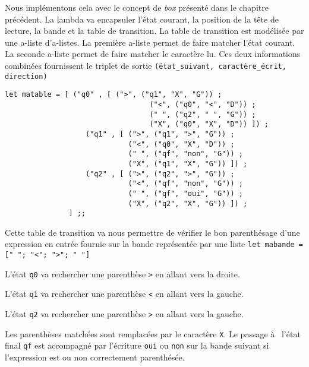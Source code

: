 Nous implémentons cela avec le concept de \textit{box} présenté dans le chapitre
précédent. La lambda va encapsuler l'état courant, la position de la tête de
lecture, la bande et la table de transition.
La table de transition est modélisée par une a-liste d'a-listes.
La première a-liste permet de faire matcher l'état courant.
La seconde a-liste permet de faire matcher le caractère lu.
Ces deux informations combinées fournissent  le triplet de sortie
\verb+(état_suivant, caractère_écrit, direction)+

\begin{Verbatim}
let matable = [ ("q0" , [ (">", ("q1", "X", "G")) ;
								  ("<", ("q0", "<", "D")) ; 
								  (" ", ("q2", " ", "G")) ;
								  ("X", ("q0", "X",	"D")) ]) ;
			       ("q1" , [ (">", ("q1", ">", "G")) ;
			                 ("<", ("q0", "X", "D")) ;
			                 (" ", ("qf", "non", "G")) ;
			                 ("X", ("q1", "X", "G")) ]) ;
			       ("q2" , [ (">", ("q2", ">", "G")) ;
			                 ("<", ("qf", "non", "G")) ;
			                 (" ", ("qf", "oui", "G")) ;
			                 ("X", ("q2", "X", "G")) ]) ;
			   ] ;;
\end{Verbatim}

Cette table de transition va nous permettre de vérifier le bon parenthésage
d'une expression en entrée fournie sur la bande représentée par une liste 
\verb+let mabande =   [" "; "<"; ">"; " "]+

L'état \verb+q0+ va rechercher une parenthèse \verb+>+ en allant vers la droite.

L'état \verb+q1+ va rechercher une parenthèse \verb+<+ en allant vers la gauche.

L'état \verb+q2+ va rechercher une parenthèse \verb+>+ en allant vers la gauche.


Les parenthèses matchées sont remplacées par le caractère \verb+X+.
Le passage à  l'état final \verb+qf+ est accompagné par l'écriture \verb+oui+ ou
\verb+non+ sur la bande suivant si l'expression est ou non correctement parenthésée.

